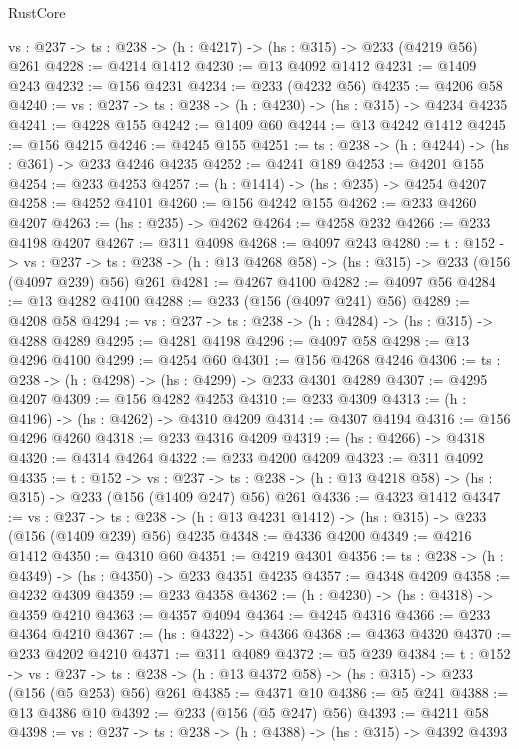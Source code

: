 \begin{lexlean}{RustCore}
\begin{coremodule}
  {vs : @237} -> {ts : @238} -> (h : @4217) -> (hs : @315) -> @233 (@4219 @56) @261
@4228 := @4214 @1412
@4230 := @13 @4092 @1412
@4231 := @1409 @243
@4232 := @156 @4231
@4234 := @233 (@4232 @56)
@4235 := @4206 @58
@4240 := {vs : @237} -> {ts : @238} -> (h : @4230) -> (hs : @315) -> @4234 @4235
@4241 := @4228 @155
@4242 := @1409 @60
@4244 := @13 @4242 @1412
@4245 := @156 @4215
@4246 := @4245 @155
@4251 := {ts : @238} -> (h : @4244) -> (hs : @361) -> @233 @4246 @4235
@4252 := @4241 @189
@4253 := @4201 @155
@4254 := @233 @4253
@4257 := (h : @1414) -> (hs : @235) -> @4254 @4207
@4258 := @4252 @4101
@4260 := @156 @4242 @155
@4262 := @233 @4260 @4207
@4263 := (hs : @235) -> @4262
@4264 := @4258 @232
@4266 := @233 @4198 @4207
@4267 := @311 @4098
@4268 := @4097 @243
@4280 := {t : @152} ->
  {vs : @237} ->
  {ts : @238} -> (h : @13 @4268 @58) -> (hs : @315) -> @233 (@156 (@4097 @239) @56) @261
@4281 := @4267 @4100
@4282 := @4097 @56
@4284 := @13 @4282 @4100
@4288 := @233 (@156 (@4097 @241) @56)
@4289 := @4208 @58
@4294 := {vs : @237} -> {ts : @238} -> (h : @4284) -> (hs : @315) -> @4288 @4289
@4295 := @4281 @4198
@4296 := @4097 @58
@4298 := @13 @4296 @4100
@4299 := @4254 @60
@4301 := @156 @4268 @4246
@4306 := {ts : @238} -> (h : @4298) -> (hs : @4299) -> @233 @4301 @4289
@4307 := @4295 @4207
@4309 := @156 @4282 @4253
@4310 := @233 @4309
@4313 := (h : @4196) -> (hs : @4262) -> @4310 @4209
@4314 := @4307 @4194
@4316 := @156 @4296 @4260
@4318 := @233 @4316 @4209
@4319 := (hs : @4266) -> @4318
@4320 := @4314 @4264
@4322 := @233 @4200 @4209
@4323 := @311 @4092
@4335 := {t : @152} ->
  {vs : @237} ->
  {ts : @238} -> (h : @13 @4218 @58) -> (hs : @315) -> @233 (@156 (@1409 @247) @56) @261
@4336 := @4323 @1412
@4347 := {vs : @237} ->
  {ts : @238} -> (h : @13 @4231 @1412) -> (hs : @315) -> @233 (@156 (@1409 @239) @56) @4235
@4348 := @4336 @4200
@4349 := @4216 @1412
@4350 := @4310 @60
@4351 := @4219 @4301
@4356 := {ts : @238} -> (h : @4349) -> (hs : @4350) -> @233 @4351 @4235
@4357 := @4348 @4209
@4358 := @4232 @4309
@4359 := @233 @4358
@4362 := (h : @4230) -> (hs : @4318) -> @4359 @4210
@4363 := @4357 @4094
@4364 := @4245 @4316
@4366 := @233 @4364 @4210
@4367 := (hs : @4322) -> @4366
@4368 := @4363 @4320
@4370 := @233 @4202 @4210
@4371 := @311 @4089
@4372 := @5 @239
@4384 := {t : @152} ->
  {vs : @237} -> {ts : @238} -> (h : @13 @4372 @58) -> (hs : @315) -> @233 (@156 (@5 @253) @56) @261
@4385 := @4371 @10
@4386 := @5 @241
@4388 := @13 @4386 @10
@4392 := @233 (@156 (@5 @247) @56)
@4393 := @4211 @58
@4398 := {vs : @237} -> {ts : @238} -> (h : @4388) -> (hs : @315) -> @4392 @4393

\end{coremodule}
\end{lexlean}

